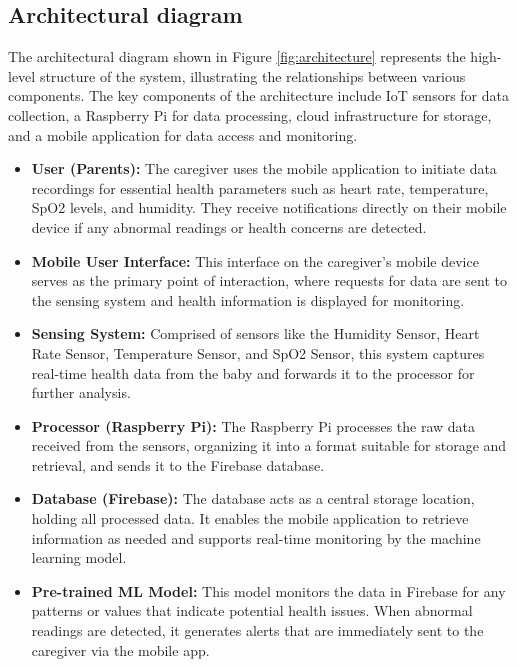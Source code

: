 \documentclass[12pt,a4paper]{report}
\begin{document}
\subsection{Architectural diagram}
The architectural diagram shown in Figure \ref{fig:architecture} represents the high-level structure of the system, illustrating the relationships between various components. The key components of the architecture include IoT sensors for data collection, a Raspberry Pi for data processing, cloud infrastructure for storage, and a mobile application for data access and monitoring.
\begin{itemize}
  \item \textbf{User (Parents):} The caregiver uses the mobile application to initiate data recordings for essential health parameters such as heart rate, temperature, SpO2 levels, and humidity. They receive notifications directly on their mobile device if any abnormal readings or health concerns are detected.
  \item \textbf{Mobile User Interface:} This interface on the caregiver’s mobile device serves as the primary point of interaction, where requests for data are sent to the sensing system and health information is displayed for monitoring.
  \item \textbf{Sensing System:} Comprised of sensors like the Humidity Sensor, Heart Rate Sensor, Temperature Sensor, and SpO2 Sensor, this system captures real-time health data from the baby and forwards it to the processor for further analysis.
  \item \textbf{Processor (Raspberry Pi):} The Raspberry Pi processes the raw data received from the sensors, organizing it into a format suitable for storage and retrieval, and sends it to the Firebase database.
  \item \textbf{Database (Firebase):} The database acts as a central storage location, holding all processed data. It enables the mobile application to retrieve information as needed and supports real-time monitoring by the machine learning model.
  \item \textbf{Pre-trained ML Model:} This model monitors the data in Firebase for any patterns or values that indicate potential health issues. When abnormal readings are detected, it generates alerts that are immediately sent to the caregiver via the mobile app.
\end{itemize}
\end{document}
